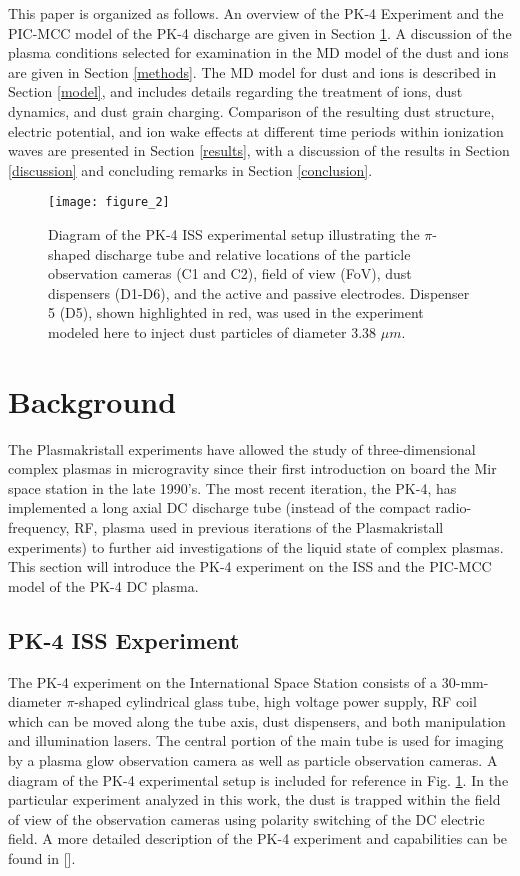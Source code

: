 \documentclass[aip,amsmath,amssymb,graphicx,floatfix,reprint]{revtex4-1}
\begin{document}
This paper is organized as follows.  An overview of the PK-4 Experiment and the PIC-MCC model of the PK-4 discharge are given in Section \ref{background}.  A discussion of the plasma conditions selected for examination in the MD model of the dust and ions are given in Section \ref{methods}.  The MD model for dust and ions is described in Section \ref{model}, and includes details regarding the treatment of ions, dust dynamics, and dust grain charging.  Comparison of the resulting dust structure, electric potential, and ion wake effects at different time periods within ionization waves are presented in Section \ref{results}, with a discussion of the results in Section \ref{discussion} and concluding remarks in Section \ref{conclusion}.

\begin{figure} [b]
\texttt{[image: figure\_2]}
\caption{Diagram of the PK-4 ISS experimental setup illustrating the $\pi$-shaped discharge tube and relative locations of the particle observation cameras (C1 and C2), field of view (FoV), dust dispensers (D1-D6), and the active and passive electrodes.  Dispenser 5 (D5), shown highlighted in red, was used in the experiment modeled here to inject dust particles of diameter 3.38 $\mu m$.}
\label{fig:pk4_setup}
\end{figure}

\section{Background}
\label{background}
The Plasmakristall experiments have allowed the study of three-dimensional complex plasmas in microgravity since their first introduction on board the Mir space station in the late 1990's\cite{MorfillBook2013}.  The most recent iteration, the PK-4, has implemented a long axial DC discharge tube (instead of the compact radio-frequency, RF, plasma used in previous iterations of the Plasmakristall experiments) to further aid investigations of the liquid state of complex plasmas\cite{MorfillBook2013}.  This section will introduce the PK-4 experiment on the ISS  and the PIC-MCC model of the PK-4 DC plasma\cite{Hartmann2020}.



\subsection{PK-4 ISS Experiment}
\label{PK4}
The PK-4 experiment on the International Space Station consists of a 30-mm-diameter $\pi$-shaped cylindrical glass tube, high voltage power supply, RF coil which can be moved along the tube axis, dust dispensers, and both manipulation and illumination lasers.  The central portion of the main tube is used for imaging by a plasma glow observation camera as well as particle observation cameras.  A diagram of the PK-4 experimental setup is included for reference in Fig. \ref{fig:pk4_setup}.  In the particular experiment analyzed in this work, the dust is trapped within the field of view of the observation cameras using polarity switching of the DC electric field.  A more detailed description of the PK-4 experiment and capabilities can be found in [].  
\end{document}
